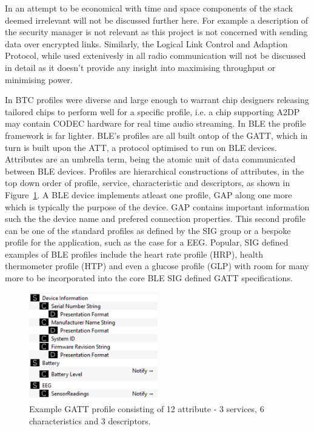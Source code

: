 \documentclass[]{article}
\begin{document}
In an attempt to be economical with time and space components of the stack deemed irrelevant will not be discussed further here. For example a description of the security manager is not relevant as this project is not concerned with sending data over encrypted links. Similarly, the Logical Link Control and Adaption Protocol, while used extenivesly in all radio communication will not be discussed in detail as it doesn't provide any insight into maximising throughput or minimising power.

In \ac{BTC} profiles were diverse and large enough to warrant chip designers releasing tailored chips to perform well for a specific profile, i.e. a chip supporting A2DP may contain \ac{CODEC} hardware for real time audio streaming. In \ac{BLE} the profile framework is far lighter. \ac{BLE}'s profiles are all built ontop of  the \ac{GATT}, which in turn is built upon the \ac{ATT}, a protocol optimised to run on BLE devices. Attributes are an umbrella term, being the atomic unit of data communicated between BLE devices. Profiles are hierarchical constructions of attributes, in the top down order of profile, service, characteristic and descriptors, as shown in Figure~\ref{fig:exampleprofile}. A BLE device implements atleast one profile, \ac{GAP} along one more which is typically the purpose of the device. \ac{GAP} contains important information such the the device name and prefered connection properties.  This second profile can be one of the standard profiles as defined by the SIG group or a bespoke profile for the application, such as the case for a \ac{EEG}. Popular, SIG defined examples of \ac{BLE} profiles include the heart rate profile (HRP), health thermometer profile (HTP) and even a glucose profile (GLP) with room for many more to be incorporated into the core \ac{BLE} \ac{SIG} defined \ac{GATT} specifications.  

\begin{figure}[htb]
	\begin{center}
		\includegraphics[width = 0.5\textwidth]{exampleprofile}
	\end{center}
	\caption{Example GATT profile consisting of 12 attribute - 3 services, 6 characteristics and 3 descriptors. }
	\label{fig:exampleprofile}
\end{figure}
\end{document}
